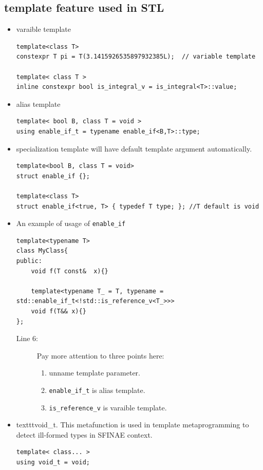 \documentclass[a4paper,11pt,twoside]{book}
\begin{document}
\subsection{template feature used in STL}
\begin{itemize}
	\item varaible template
\begin{lstlisting}[]
template<class T>
constexpr T pi = T(3.1415926535897932385L);  // variable template	

template< class T >
inline constexpr bool is_integral_v = is_integral<T>::value;
\end{lstlisting}

	\item alias template
\begin{lstlisting}[]
template< bool B, class T = void >
using enable_if_t = typename enable_if<B,T>::type;
\end{lstlisting}
	
	\item specialization template will have default template argument automatically.
\begin{lstlisting}[numbers=none]
template<bool B, class T = void>
struct enable_if {};

template<class T>
struct enable_if<true, T> { typedef T type; }; //T default is void
\end{lstlisting}

\item An example of usage of \texttt{enable\_if}
\begin{lstlisting}
template<typename T>
class MyClass{
public:
    void f(T const&  x){}
    
    template<typename T_ = T, typename = std::enable_if_t<!std::is_reference_v<T_>>>
    void f(T&& x){}
};
\end{lstlisting}
\begin{description}
    \item[Line 6:] Pay more attention to three points here:
        \begin{enumerate}
            \item unname template parameter.
            \item \texttt{enable\_if\_t} is alias template.
            \item \texttt{is\_reference\_v} is varaible template.
        \end{enumerate}
\end{description}

    \item texttt{void\_t}. This metafunction is used in template metaprogramming to detect ill-formed types in SFINAE context.
\begin{lstlisting}
template< class... >
using void_t = void;


\end{lstlisting}
\end{itemize}
\end{document}
